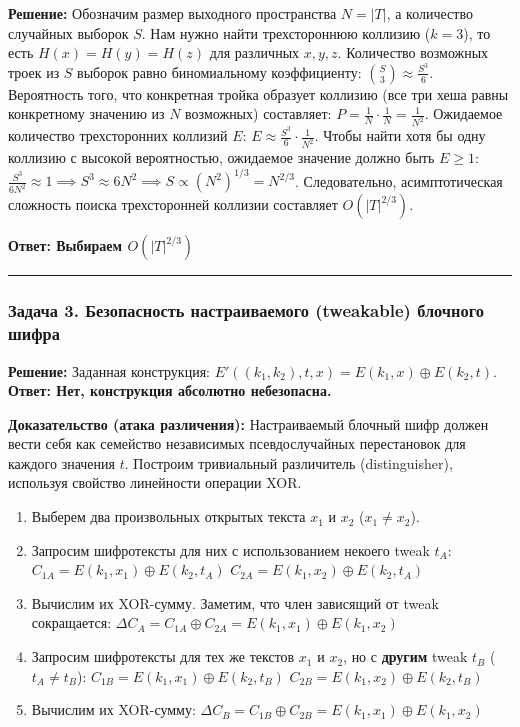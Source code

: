 \textbf{Решение:} Обозначим размер выходного пространства \(N = |T|\), а количество случайных выборок \(S\). Нам нужно найти трехстороннюю коллизию (\(k=3\)), то есть \(H(x) = H(y) = H(z)\) для различных \(x, y, z\). Количество возможных троек из \(S\) выборок равно биномиальному коэффициенту: \(\binom{S}{3} \approx \frac{S^3}{6}\). Вероятность того, что конкретная тройка образует коллизию (все три хеша равны конкретному значению из \(N\) возможных) составляет: \(P = \frac{1}{N} \cdot \frac{1}{N} = \frac{1}{N^2}\). Ожидаемое количество трехсторонних коллизий \(E\): \(E \approx \frac{S^3}{6} \cdot \frac{1}{N^2}\). Чтобы найти хотя бы одну коллизию с высокой вероятностью, ожидаемое значение должно быть \(E \ge 1\): \(\frac{S^3}{6N^2} \approx 1 \implies S^3 \approx 6N^2 \implies S \propto (N^2)^{1/3} = N^{2/3}\). Следовательно, асимптотическая сложность поиска трехсторонней коллизии составляет \(O(|T|^{2/3})\).

\textbf{Ответ: Выбираем \(O(|T|^{2/3})\)}

\begin{center}\rule{0.5\linewidth}{0.5pt}\end{center}

\subsubsection{Задача 3. Безопасность настраиваемого (tweakable) блочного шифра}\label{ux437ux430ux434ux430ux447ux430-3.-ux431ux435ux437ux43eux43fux430ux441ux43dux43eux441ux442ux44c-ux43dux430ux441ux442ux440ux430ux438ux432ux430ux435ux43cux43eux433ux43e-tweakable-ux431ux43bux43eux447ux43dux43eux433ux43e-ux448ux438ux444ux440ux430}

\textbf{Решение:} Заданная конструкция: \(E'((k_1,k_2), t, x) = E(k_1, x) \oplus E(k_2, t)\). \textbf{Ответ: Нет, конструкция абсолютно небезопасна.}

\textbf{Доказательство (атака различения):} Настраиваемый блочный шифр должен вести себя как семейство независимых псевдослучайных перестановок для каждого значения \(t\). Построим тривиальный различитель (distinguisher), используя свойство линейности операции XOR.

\begin{enumerate}
\def\labelenumi{\arabic{enumi}.}
\tightlist
\item
  Выберем два произвольных открытых текста \(x_1\) и \(x_2\) (\(x_1 \neq x_2\)).
\item
  Запросим шифротексты для них с использованием некоего tweak \(t_A\): \(C_{1A} = E(k_1, x_1) \oplus E(k_2, t_A)\) \(C_{2A} = E(k_1, x_2) \oplus E(k_2, t_A)\)
\item
  Вычислим их XOR-сумму. Заметим, что член зависящий от tweak сокращается: \(\Delta C_A = C_{1A} \oplus C_{2A} = E(k_1, x_1) \oplus E(k_1, x_2)\)
\item
  Запросим шифротексты для тех же текстов \(x_1\) и \(x_2\), но с \textbf{другим} tweak \(t_B\) (\(t_A \neq t_B\)): \(C_{1B} = E(k_1, x_1) \oplus E(k_2, t_B)\) \(C_{2B} = E(k_1, x_2) \oplus E(k_2, t_B)\)
\item
  Вычислим их XOR-сумму: \(\Delta C_B = C_{1B} \oplus C_{2B} = E(k_1, x_1) \oplus E(k_1, x_2)\)
\end{enumerate}

